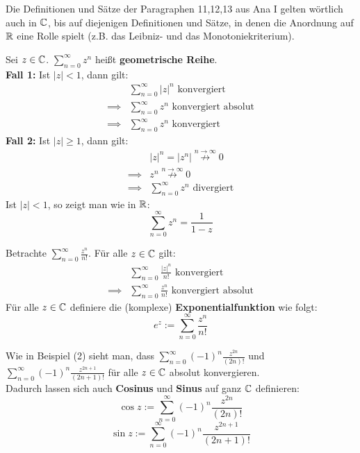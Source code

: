 \documentclass[a4paper,twoside,DIV15,BCOR12mm,chapterprefix=true,headings=twolinechapter]{scrbook}
\begin{document}
Die Definitionen und Sätze der Paragraphen 11,12,13 aus Ana I gelten wörtlich
auch in $\mathbb{C}$, bis auf diejenigen Definitionen und Sätze, in denen die Anordnung
auf $\mathbb{R}$ eine Rolle spielt (z.B. das Leibniz- und das Monotoniekriterium).
\\
\begin{beispiele}
\item Sei $z\in\mathbb{C}$. $\sum_{n=0}^{\infty} z^n$ heißt \textbf{geometrische Reihe}.\\
\textbf{Fall 1:} Ist $|z|< 1$, dann gilt:
\begin{align*}
&\sum_{n=0}^{\infty} |z|^n \text{ konvergiert}\\
\implies &\sum_{n=0}^{\infty} z^n\text{ konvergiert absolut}\\
\implies &\sum_{n=0}^{\infty} z^n\text{ konvergiert}
\end{align*}
\textbf{Fall 2:} Ist $|z|\ge 1$, dann gilt:
\begin{align*}
&|z|^n=|z^n|\stackrel{n\to\infty}{\not\to} 0\\
\implies &z^n\stackrel{n\to\infty}{\not\to} 0\\
\implies &\sum_{n=0}^{\infty} z^n \text{ divergiert}
\end{align*}
Ist $|z|<1$, so zeigt man wie in $\mathbb{R}$:
\[\sum_{n=0}^{\infty} z^n= \frac1{1-z}\]
\item Betrachte $\sum_{n=0}^\infty \frac{z^n}{n!}$. Für alle $z\in\mathbb{C}$ gilt:
\begin{align*}
&\sum_{n=0}^\infty \frac{|z|^n}{n!} \text{ konvergiert}\\
\implies &\sum_{n=0}^\infty \frac{z^n}{n!} \text{ konvergiert absolut}
\end{align*}
Für alle $z\in\mathbb{C}$ definiere die (komplexe) \textbf{Exponentialfunktion} wie folgt:
\[e^z:=\sum_{n=0}^\infty\frac{z^n}{n!}\]
\item Wie in Beispiel (2) sieht man, dass $\sum_{n=0}^\infty (-1)^n \frac{z^{2n}}{(2n)!}$ und
$\sum_{n=0}^\infty (-1)^n \frac{z^{2n+1}}{(2n+1)!}$ für alle $z\in\mathbb{C}$ absolut konvergieren.\\
Dadurch lassen sich auch \textbf{Cosinus} und \textbf{Sinus} auf ganz $\mathbb{C}$ definieren:
\[\cos{z}:=\sum_{n=0}^\infty (-1)^n\frac{z^{2n}}{(2n)!}\]
\[\sin{z}:=\sum_{n=0}^\infty (-1)^n\frac{z^{2n+1}}{(2n+1)!}\]
\end{beispiele}
\end{document}
